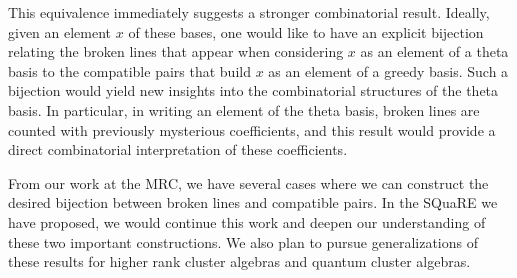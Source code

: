 \documentclass{amsart}
\begin{document}
    This equivalence immediately suggests a stronger combinatorial result.
    Ideally, given an element $x$ of these bases, one would like to have an
    explicit bijection relating the broken lines that appear when considering
    $x$ as an element of a theta basis to the compatible pairs that build $x$ as
    an element of a greedy basis.
    Such a bijection would yield new insights into the combinatorial structures
    of the theta basis.
    In particular, in writing an element of the theta basis, broken lines are
    counted with previously mysterious coefficients, and this result would
    provide a direct combinatorial interpretation of these coefficients.
    
    From our work at the MRC, we have several cases where we can construct the
    desired bijection between broken lines and compatible pairs.
    In the SQuaRE we have proposed, we would continue this work and deepen our
    understanding of these two important constructions.
    We also plan to pursue generalizations of these results for higher rank
    cluster algebras and quantum cluster algebras.
\end{document}
